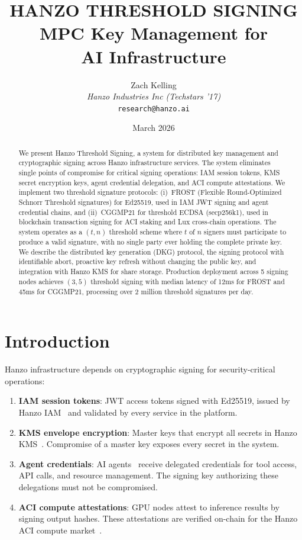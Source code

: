 \documentclass[11pt]{article}
\title{HANZO THRESHOLD SIGNING\\[0.3em]
{\large MPC Key Management for\\AI Infrastructure}}
\author{
    Zach Kelling \\
    \textit{Hanzo Industries Inc (Techstars '17)} \\
    \texttt{research@hanzo.ai}
}
\date{March 2026}
\begin{document}
\hanzocoverpage

\begin{abstract}
We present Hanzo Threshold Signing, a system for distributed key management and
cryptographic signing across Hanzo infrastructure services. The system eliminates
single points of compromise for critical signing operations: IAM session tokens,
KMS secret encryption keys, agent credential delegation, and ACI compute
attestations. We implement two threshold signature protocols: (i)~FROST
(Flexible Round-Optimized Schnorr Threshold signatures) for Ed25519, used in
IAM JWT signing and agent credential chains, and (ii)~CGGMP21 for threshold
ECDSA (secp256k1), used in blockchain transaction signing for ACI staking and
Lux cross-chain operations. The system operates as a $(t, n)$ threshold scheme
where $t$ of $n$ signers must participate to produce a valid signature, with no
single party ever holding the complete private key. We describe the distributed
key generation (DKG) protocol, the signing protocol with identifiable abort,
proactive key refresh without changing the public key, and integration with
Hanzo KMS for share storage. Production deployment across 5 signing nodes
achieves $(3, 5)$ threshold signing with median latency of 12ms for FROST and
45ms for CGGMP21, processing over 2 million threshold signatures per day.
\end{abstract}

\section{Introduction}
\label{sec:intro}

Hanzo infrastructure depends on cryptographic signing for security-critical
operations:
\begin{enumerate}[leftmargin=1.4em]
    \item \textbf{IAM session tokens}: JWT access tokens signed with Ed25519,
    issued by Hanzo IAM~\cite{hanzoiam} and validated by every service in the
    platform.
    \item \textbf{KMS envelope encryption}: Master keys that encrypt all
    secrets in Hanzo KMS~\cite{hanzokms}. Compromise of a master key exposes
    every secret in the system.
    \item \textbf{Agent credentials}: AI agents~\cite{hanzoagentsdk} receive
    delegated credentials for tool access, API calls, and resource management.
    The signing key authorizing these delegations must not be compromised.
    \item \textbf{ACI compute attestations}: GPU nodes attest to inference
    results by signing output hashes. These attestations are verified on-chain
    for the Hanzo ACI compute market~\cite{hanzoaci}.
\end{enumerate}
\end{document}
